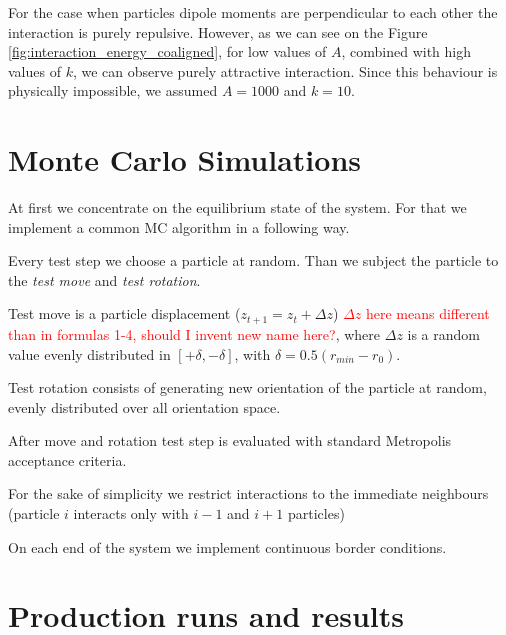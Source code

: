 \documentclass[12pt,a4paper]{article}
\begin{document}
For the case when particles dipole moments are perpendicular to each other the interaction is purely repulsive. However, as we can see on the Figure \ref{fig:interaction_energy_coaligned}, for low values of $A$, combined with high values of $k$, we can observe purely attractive interaction. Since this behaviour is physically impossible, we assumed $A = 1000$ and $k = 10$.


\section{Monte Carlo Simulations}

At first we concentrate on the equilibrium state of the system. For that we implement a common MC algorithm in a following way.

Every test step we choose a particle at random. Than we subject the particle to the \emph{test move} and \emph{test rotation}.

Test move is a particle displacement ($z_{t+1} = z_t + \Delta z$) \textcolor{red}{$\Delta z$ here means different than in formulas 1-4, should I invent new name here?}, where $\Delta z$ is a random value evenly distributed in $[+\delta, -\delta]$, with $\delta = 0.5 (r_{min} - r_0)$. 

Test rotation consists of generating new orientation of the particle at random, evenly distributed over all orientation space.

After move and rotation test step is evaluated with standard Metropolis acceptance criteria.

For the sake of simplicity we restrict interactions to the immediate neighbours (particle $i$ interacts only with $i-1$ and $i+1$ particles) 

On each end of the system we implement continuous border conditions.

\section{Production runs and results}
\end{document}
